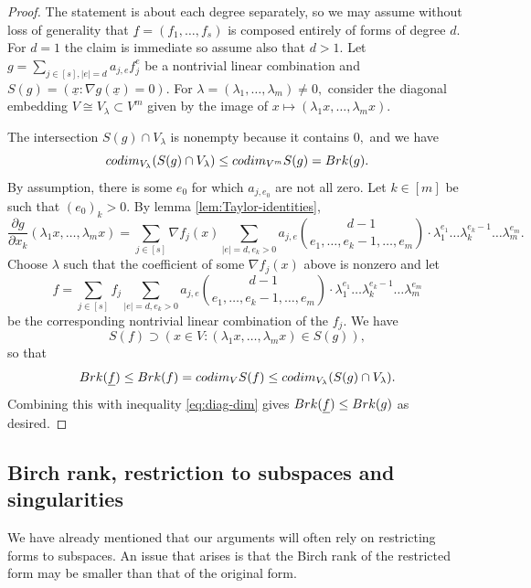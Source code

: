 \documentclass[10pt,a4paper]{amsart}
\let\ul\underline
\theoremstyle{definition}
\newcommand{\codim}{\textnormal{codim}}
\newcommand{\brk}{\textnormal{Brk}}
\begin{document}
\begin{proof}
    The statement is about each degree separately, so we may assume without loss of generality that $\ul{f}=(f_1,\ldots,f_s)$ is composed entirely of forms of degree $d.$ For $d=1$ the claim is immediate so assume also that $d>1.$ Let $g = \sum_{j\in [s], |e| = d} a_{j,e}f^e_j $ be a nontrivial linear combination and $S(g) = (\ul{x}: \nabla g(\ul{x}) = 0).$  For $\lambda = (\lambda_1,\ldots,\lambda_m) \neq 0,$ consider the diagonal embedding $V\cong V_\lambda \subset V^m$ given by the image of  $x\mapsto (\lambda_1 x,\ldots,\lambda_m x).$ 
    
    The intersection $S(g)\cap V_\lambda$ is nonempty because it contains $0,$ and we have
    \begin{equation}\label{eq:diag-dim}
        \codim_{V_\lambda} (S(g)\cap V_\lambda) \le \codim_{V^m} S(g) = \brk(g). 
    \end{equation}
    By assumption, there is some $e_0$ for which $a_{j,e_0}$ are not all zero. Let $k\in [m]$ be such that $(e_0)_k>0.$ By lemma \ref{lem:Taylor-identities}, 
    \[
    \frac{\partial g}{\partial x_k} (\lambda_1 x,\ldots,\lambda_m x) = \sum_{j\in [s]} \nabla f_j(x) \sum_{|e|=d, e_k>0} a_{j,e} \binom{d-1}{e_1,\ldots,e_k-1,\ldots,e_m} \cdot \lambda_1^{e_1}\ldots\lambda_k^{e_k-1}\ldots\lambda_m^{e_m} .
    \]
    Choose $\lambda$ such that the coefficient of some $\nabla f_j(x)$ above is nonzero and let 
    \[
    f = \sum_{j\in [s]} f_j \sum_{|e|=d, e_k>0} a_{j,e} \binom{d-1}{e_1,\ldots,e_k-1,\ldots,e_m} \cdot \lambda_1^{e_1}\ldots\lambda_k^{e_k-1}\ldots\lambda_m^{e_m}
    \]
    be the corresponding nontrivial linear combination of the $f_j.$ We have 
    \[
    S(f)\supset (x\in V: (\lambda_1 x,\ldots,\lambda_m x) \in S(g)) , 
    \]
    so that
    \[
    \brk(\ul{f}) \le \brk(f) = \codim_V S(f) \le \codim_{V_\lambda} (S(g)\cap V_\lambda).
    \]
    Combining this with inequality \eqref{eq:diag-dim} gives $\brk(\ul{f}) \le \brk(g)$ as desired.
\end{proof}

\subsection{Birch rank, restriction to subspaces and singularities}

We have already mentioned that our arguments will often rely on restricting forms to subspaces. An issue that arises is that the Birch rank of the restricted form may be smaller than that of the original form. 
\end{document}
